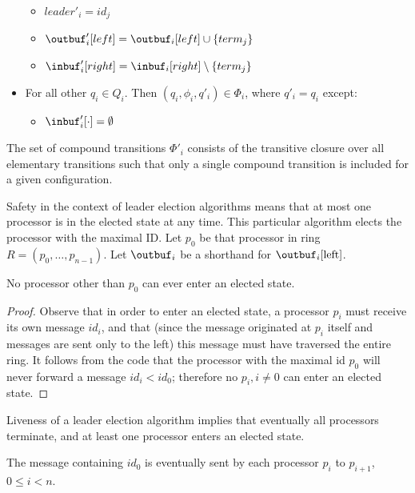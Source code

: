\begin{itemize}
      \begin{itemize}
      \item $leader'_i = id_j$
      \item $\outbuf'_i[left] = \outbuf_i[left] \cup \{term_j\}$
      \item $\inbuf'_i[right] = \inbuf_i[right] \setminus \{term_j\}$
      \end{itemize}
\item For all other $q_i \in Q_i$.
      Then $(q_i, \phi_i, q'_i) \in \Phi_i$,
      where $q'_i = q_i$ except:
      \begin{itemize}
      \item $\inbuf'_i[\cdot] = \emptyset$
      \end{itemize}
\end{itemize}

The set of compound transitions $\Phi'_i$ consists of the transitive closure over all elementary
transitions such that only a single compound transition is included for a given configuration.

Safety in the context of leader election algorithms means that at most one processor is in the
elected state at any time. This particular algorithm elects the processor with the maximal ID.
Let $p_0$ be that processor in ring $R = (p_0, \ldots, p_{n-1})$. Let $\outbuf_i$ be a shorthand for
$\outbuf_i[\text{left}]$.

\begin{theorem}
No processor other than $p_0$ can ever enter an elected state.
\end{theorem}

\begin{proof}
Observe that in order to enter an elected state, a processor $p_i$ must receive its own message
$id_i$, and that (since the message originated at $p_i$ itself and messages are sent only to the left)
this message must have traversed the entire ring. It follows from the code that the processor with
the maximal id $p_0$ will never forward a message $id_i < id_0$; therefore no $p_i, i \neq 0$ can
enter an elected state.
\end{proof}

Liveness of a leader election algorithm implies that eventually all processors terminate, and
at least one processor enters an elected state.

\begin{lemma} \label{lemma:le-liveness}
The message containing $id_0$ is eventually sent by each processor $p_i$ to $p_{i+1}$,
$0 \leq i < n$.
\end{lemma}

